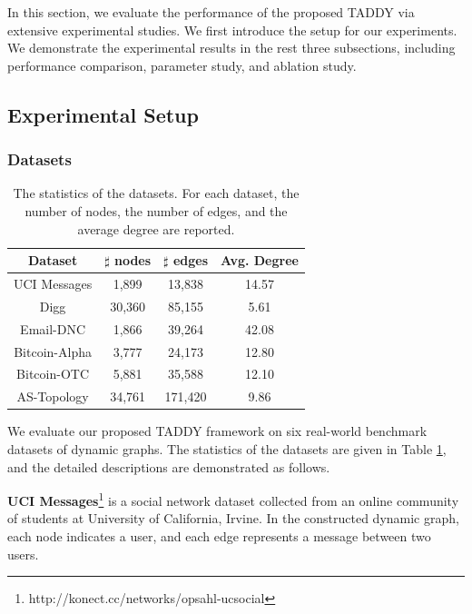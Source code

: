 \documentclass[10pt,journal,compsoc]{IEEEtran}
\newcommand{\HL}{}
\begin{document}
In this section, we evaluate the performance of the proposed TADDY via extensive experimental \HL{studies}. We first introduce the setup for our experiments. We demonstrate the experimental results in the rest three subsections, including performance comparison, parameter study, and ablation study.

\subsection{Experimental Setup}

\subsubsection{Datasets}

\begin{table}
	\centering
	\caption{The statistics of the datasets. \HL{For each dataset, the number of nodes, the number of edges, and the average degree are reported.}}
	\vspace{-2mm}
	\begin{tabular}{@{}c|c|c|c@{}}
		\toprule
		{Dataset} &  {$\sharp$ nodes} & {$\sharp$ edges} & {Avg. Degree} \\ \midrule
		{UCI Messages}  & 1,899    & 13,838      & 14.57   \\
		{Digg}          & 30,360   & 85,155      & 5.61    \\
		\HL{Email-DNC}     & \HL{1,866}    & \HL{39,264}      & \HL{42.08}   \\
		{Bitcoin-Alpha} & 3,777    & 24,173      & 12.80   \\
		{Bitcoin-OTC}   & 5,881    & 35,588      & 12.10   \\
		\HL{AS-Topology}   & \HL{34,761}   & \HL{171,420}     & \HL{9.86}    \\
		
		\bottomrule
	\end{tabular}
	\label{table:dataset}
	\vspace{-2mm}
\end{table}

We evaluate our proposed TADDY framework on \HL{six} 
real-world benchmark datasets of dynamic graphs. The statistics of the datasets are given in Table \ref{table:dataset}, and the detailed descriptions are demonstrated as follows.

\textbf{UCI Messages}\footnote{http://konect.cc/networks/opsahl-ucsocial} \cite{opsahl2009clustering} is a social network dataset collected from an online community of students at University of California, Irvine. In the constructed dynamic graph, each node indicates a user, and each edge represents a message between two users.  
\end{document}
